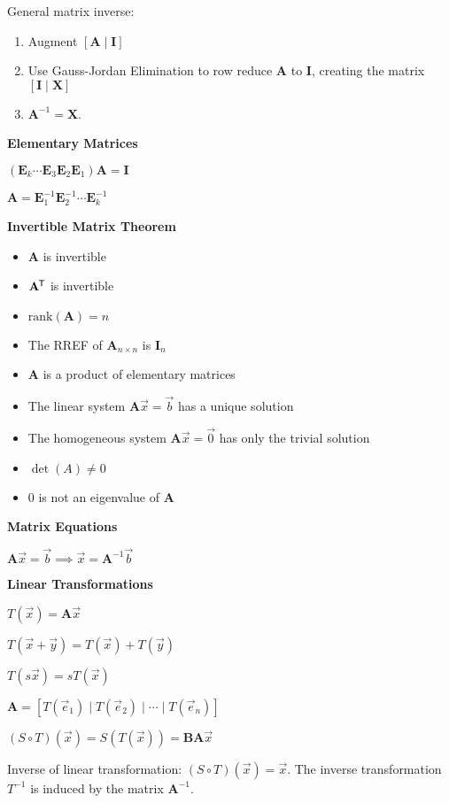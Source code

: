 \documentclass[10pt]{article}
\newcommand{\rank}{\mathrm{rank}}
\newcommand{\matr}[1]{\mathbf{#1}}
\newcommand{\tran}{^{\mkern-1.5mu\mathsf{T}}}
\newcommand{\inv}{^{-1}}
\newcommand\heading[1]{\medskip\textbf{#1}\medskip}
\begin{document}
\begin{multicols*}{3}
General matrix inverse:

\begin{enumerate}[noitemsep,topsep=0pt]
    \item Augment $[\matr{A}\mid\matr{I}]$  
    \item Use Gauss-Jordan Elimination to row reduce $\matr{A}$ to $\matr{I}$, creating the matrix $[\matr{I}\mid\matr{X}]$
    \item $\matr{A}\inv=\matr{X}$.
\end{enumerate}

\heading{Elementary Matrices}

$(\matr{E}_k\cdots\matr{E}_3\matr{E}_2\matr{E}_1)\matr{A}=\matr{I}$

$\matr{A}=\matr{E}_1\inv\matr{E}_2\inv\cdots\matr{E}_k\inv$

\heading{Invertible Matrix Theorem}

\begin{itemize}[noitemsep,topsep=0pt]
    \item $\matr{A}$ is invertible 
    \item $\matr{A}\tran$ is invertible 
    \item $\rank(\matr{A})=n$
    \item The RREF of $\matr{A}_{n\times n}$ is $\matr{I}_n$
    \item $\matr{A}$ is a product of elementary matrices
    \item The linear system $\matr{A}\vec x=\vec b$ has a unique solution 
    \item The homogeneous system $\matr{A}\vec x=\vec 0$ has only the trivial solution 
    \item $\det(A)\ne 0$
    \item $0$ is not an eigenvalue of $\matr{A}$
\end{itemize}

\heading{Matrix Equations}

$\matr{A}\vec x=\vec b \implies \vec x = \matr{A}\inv\vec b$

\heading{Linear Transformations}

$T(\vec x)=\matr{A}\vec x$

$T(\vec x+\vec y)=T(\vec x)+T(\vec y)$

$T(s\vec x)=sT(\vec x)$

$\matr{A}=[T(\vec e_1)\mid T(\vec e_2)\mid\cdots\mid T(\vec e_n)]$

$(S\circ T)(\vec x)=S(T(\vec x))=\matr{B}\matr{A}\vec x$

Inverse of linear transformation: $(S\circ T)(\vec x)=\vec x$. The inverse transformation $T\inv$ is induced by the matrix $\matr{A}\inv$.


\end{multicols*}
\end{document}
